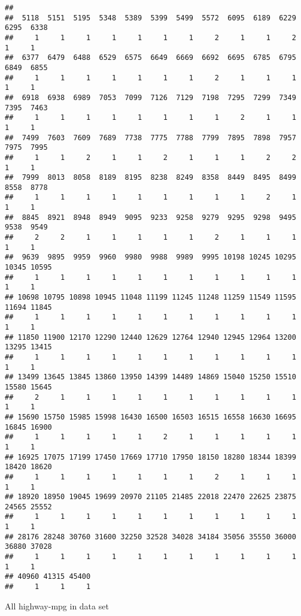 \documentclass[
]{article}
\newenvironment{Shaded}{\begin{snugshade}}{\end{snugshade}}
\newcommand{\AttributeTok}[1]{\textcolor[rgb]{0.77,0.63,0.00}{#1}}
\newcommand{\FunctionTok}[1]{\textcolor[rgb]{0.00,0.00,0.00}{#1}}
\newcommand{\NormalTok}[1]{#1}
\newcommand{\SpecialCharTok}[1]{\textcolor[rgb]{0.00,0.00,0.00}{#1}}
\newcommand{\StringTok}[1]{\textcolor[rgb]{0.31,0.60,0.02}{#1}}
\begin{document}
\begin{verbatim}
## 
##  5118  5151  5195  5348  5389  5399  5499  5572  6095  6189  6229  6295  6338 
##     1     1     1     1     1     1     1     2     1     1     2     1     1 
##  6377  6479  6488  6529  6575  6649  6669  6692  6695  6785  6795  6849  6855 
##     1     1     1     1     1     1     1     2     1     1     1     1     1 
##  6918  6938  6989  7053  7099  7126  7129  7198  7295  7299  7349  7395  7463 
##     1     1     1     1     1     1     1     1     2     1     1     1     1 
##  7499  7603  7609  7689  7738  7775  7788  7799  7895  7898  7957  7975  7995 
##     1     1     2     1     1     2     1     1     1     2     2     1     1 
##  7999  8013  8058  8189  8195  8238  8249  8358  8449  8495  8499  8558  8778 
##     1     1     1     1     1     1     1     1     1     2     1     1     1 
##  8845  8921  8948  8949  9095  9233  9258  9279  9295  9298  9495  9538  9549 
##     2     2     1     1     1     1     1     2     1     1     1     1     1 
##  9639  9895  9959  9960  9980  9988  9989  9995 10198 10245 10295 10345 10595 
##     1     1     1     1     1     1     1     1     1     1     1     1     1 
## 10698 10795 10898 10945 11048 11199 11245 11248 11259 11549 11595 11694 11845 
##     1     1     1     1     1     1     1     1     1     1     1     1     1 
## 11850 11900 12170 12290 12440 12629 12764 12940 12945 12964 13200 13295 13415 
##     1     1     1     1     1     1     1     1     1     1     1     1     1 
## 13499 13645 13845 13860 13950 14399 14489 14869 15040 15250 15510 15580 15645 
##     2     1     1     1     1     1     1     1     1     1     1     1     1 
## 15690 15750 15985 15998 16430 16500 16503 16515 16558 16630 16695 16845 16900 
##     1     1     1     1     1     2     1     1     1     1     1     1     1 
## 16925 17075 17199 17450 17669 17710 17950 18150 18280 18344 18399 18420 18620 
##     1     1     1     1     1     1     1     2     1     1     1     1     1 
## 18920 18950 19045 19699 20970 21105 21485 22018 22470 22625 23875 24565 25552 
##     1     1     1     1     1     1     1     1     1     1     1     1     1 
## 28176 28248 30760 31600 32250 32528 34028 34184 35056 35550 36000 36880 37028 
##     1     1     1     1     1     1     1     1     1     1     1     1     1 
## 40960 41315 45400 
##     1     1     1
\end{verbatim}

All highway-mpg in data set

\begin{Shaded}
\end{Shaded}
\end{document}
